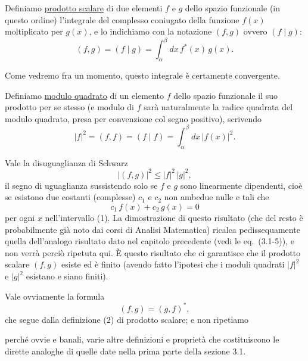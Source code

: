 \documentclass[11pt, a4paper]{book}
\numberwithin{equation}{section}
\begin{document}

Definiamo \uline{prodotto scalare} di due elementi $f$ e $g$ dello
spazio funzionale (in questo ordine) l'integrale del complesso coniugato
della funzione $f(x)$ moltiplicato per $g(x)$, e lo indichiamo con la
notazione $(f,g)$ ovvero $(f\mid g)$:
\begin{equation}
(f,g) = (f\mid g) = \int_\alpha^\beta dx\, f^*(x)\,g(x).
\end{equation}

Come vedremo fra un momento, questo integrale è certamente convergente.

Definiamo \uline{modulo quadrato} di un elemento $f$ dello spazio
funzionale il suo prodotto per se stesso (e modulo di $f$ sarà
naturalmente la radice quadrata del modulo quadrato, presa per
convenzione col segno positivo), scrivendo
\begin{equation}
|f|^2 = (f,f) = (f\mid f) = \int_\alpha^\beta dx\,|f(x)|^2.
\end{equation}

Vale la disuguaglianza di Schwarz
\begin{equation}
|(f,g)|^2 \leq |f|^2\,|g|^2,
\end{equation}
il segno di uguaglianza sussistendo solo se $f$ e $g$ sono linearmente
dipendenti, cioè se esistono due costanti (complesse) $c_1$ e $c_2$ non
ambedue nulle e tali che
\begin{equation}
c_1\,f(x) + c_2\,g(x) = 0
\end{equation}
per ogni $x$ nell'intervallo (1). La dimostrazione di questo risultato
(che del resto è probabilmente già noto dai corsi di Analisi Matematica)
ricalca pedissequamente quella dell'analogo risultato dato nel capitolo
precedente (vedi le eq.\ (3.1-5)), e non verrà perciò ripetuta qui. È
questo risultato che ci garantisce che il prodotto scalare $(f,g)$ esiste
ed è finito (avendo fatto l'ipotesi che i moduli quadrati $|f|^2$ e
$|g|^2$ esistano e siano finiti).

Vale ovviamente la formula
\begin{equation}
(f,g) = (g,f)^*,
\end{equation}
che segue dalla definizione (2) di prodotto scalare; e non ripetiamo


perché ovvie e banali, varie altre definizioni e proprietà che
costituiscono le dirette analoghe di quelle date nella prima parte della
sezione 3.1.
\end{document}
